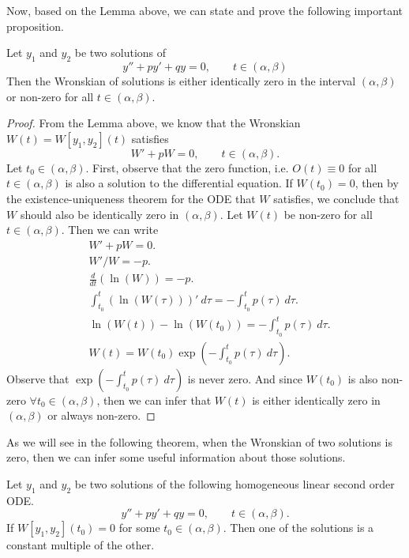 Now, based on the Lemma above, we can state and prove the following important proposition.
\begin{proposition}
	Let $ y_1 $ and $ y_2 $ be two solutions of 
	\[ y'' + py' + qy = 0, \qquad t\in (\alpha,\beta)\]
	Then the Wronskian of solutions is either identically zero in the interval $ (\alpha,\beta) $ or non-zero for all $ t \in (\alpha, \beta) $.
\end{proposition}
\begin{proof}
	From the Lemma above, we know that the Wronskian $ W(t) = W[y_1,y_2](t) $ satisfies 
	\[ W' + p W = 0, \qquad t\in (\alpha,\beta). \]
	Let $ t_0 \in (\alpha,\beta) $. First, observe that the zero function, i.e. $ O(t) \equiv 0 $ for all $ t\in(\alpha,\beta) $ is also a solution to the differential equation. If $ W(t_0)= 0 $, then by the existence-uniqueness theorem for the ODE that $ W $ satisfies, we conclude that $ W $ should also be identically zero in $ (\alpha,\beta) $. Let $ W(t) $ be non-zero for all $ t\in(\alpha,\beta) $. Then we can write
	\begin{align*}
		&W' + pW = 0. \\
		&W'/W = -p.\\
		&\frac{d}{dt} (\ln(W)) = -p.\\
		&\int_{t_0}^{t} (\ln(W(\tau)))'\ d\tau = -\int_{t_0}^{t} p(\tau)\ d\tau.\\
		& \ln(W(t)) - \ln(W(t_0)) = - \int_{t_0}^{t}p(\tau)\ d\tau. \\
		& W(t) = W(t_0)\exp(-\int_{t_0}^{t}p(\tau)\ d\tau).
	\end{align*}
	Observe that $ \exp(-\int_{t_0}^{t}p(\tau)\ d\tau) $ is never zero. And since $ W(t_0) $ is also non-zero $ \forall t_0 \in (\alpha,\beta) $, then we can infer that $ W(t) $ is either identically zero in $ (\alpha,\beta) $ or always non-zero.
\end{proof}


As we will see in the following theorem, when the Wronskian of two solutions is zero, then we can infer some useful information about those solutions.

\begin{proposition}
	Let $ y_1 $ and $ y_2 $ be two solutions of the following homogeneous linear second order ODE.
	\[ y'' + py' + qy = 0, \qquad t \in (\alpha,\beta). \]
	If $ W[y_1,y_2](t_0) = 0 $ for some $ t_0 \in (\alpha,\beta) $. Then one of the solutions is a constant multiple of the other. 
\end{proposition}
